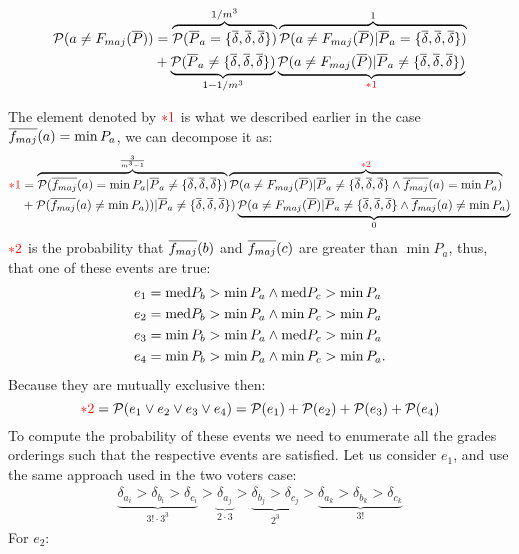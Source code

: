 \documentclass[version=3.21, pagesize, twoside=off, bibliography=totoc, DIV=calc, fontsize=12pt, a4paper]{scrartcl}
\begin{document}
\begin{align}
	\mathcal{P}(a\neq F_{maj}(\overline{P})) &=\overbrace{\mathcal{P}(\overline{P}_a=\{\overline{\delta},\overline{\delta},\overline{\delta}\})}^{1/m^3} \overbrace{\mathcal{P}(a\neq F_{maj}(\overline{P})|\overline{P}_a=\{\overline{\delta},\overline{\delta},\overline{\delta}\})}^{1}\\
	&+\underbrace{\mathcal{P}(\overline{P}_a\neq\{\overline{\delta},\overline{\delta},\overline{\delta}\})}_{1-1/m^3} \underbrace{\mathcal{P}(a\neq F_{maj}(\overline{P})|\overline{P}_a\neq\{\overline{\delta},\overline{\delta},\overline{\delta}\})}_{\color{red}*1}
\end{align}
 
The element denoted by ${\color{red}*1}$ is what we described earlier in the case $\overline{f_{maj}}(a)= \min{P_a}$, we can decompose it as:
\begin{align}
	{\color{red}*1} &=\overbrace{\mathcal{P}(\overline{f_{maj}}(a)= \min{P_a}|\overline{P}_a\neq\{\overline{\delta},\overline{\delta},\overline{\delta}\})}^{\frac{3}{m^3-1}} \overbrace{\mathcal{P}(a\neq F_{maj}(\overline{P})|\overline{P}_a\neq\{\overline{\delta},\overline{\delta},\overline{\delta}\} \wedge \overline{f_{maj}}(a)= \min{P_a})}^{{\color{red}*2}}\\
	&+\mathcal{P}(\overline{f_{maj}}(a)\neq \min{P_a})) |\overline{P}_a\neq\{\overline{\delta},\overline{\delta},\overline{\delta}\}) \underbrace{\mathcal{P}(a\neq F_{maj}(\overline{P})|\overline{P}_a\neq\{\overline{\delta},\overline{\delta},\overline{\delta}\} \wedge \overline{f_{maj}}(a)\neq \min{P_a})}_{0}
\end{align}
${\color{red}*2}$ is the probability that $\overline{f_{maj}}(b)$ and $\overline{f_{maj}}(c)$ are greater than $\min{P_a}$, thus, that one of these events are true:
\begin{align}
	e_1 &= \text{med}{P_{b}}>\min{P_{a}} \wedge \text{med}{P_{c}}>\min{P_{a}}\\
	e_2 &= \text{med}{P_{b}}>\min{P_{a}} \wedge \min{P_{c}}>\min{P_{a}}\\
	e_3 &= \min{P_{b}}>\min{P_{a}} \wedge \text{med}{P_{c}}>\min{P_{a}}\\
	e_4 &= \min{P_{b}}>\min{P_{a}} \wedge \min{P_{c}}>\min{P_{a}}.
\end{align}	
Because they are mutually exclusive then:
	\[{\color{red}*2} =\mathcal{P}(e_1 \vee e_2 \vee e_3 \vee e_4)=\mathcal{P}(e_1)+\mathcal{P}(e_2)+\mathcal{P}(e_3)+\mathcal{P}(e_4)\]
 To compute the probability of these events we need to enumerate all the grades orderings such that the respective events are satisfied. Let us consider $e_1$, and use the same approach used in the two voters case:
 \begin{align}
 	\underbrace{\delta_{a_i}>\delta_{b_i}>\delta_{c_i}}_{3!\cdot 3^3}>\underbrace{\delta_{a_j}}_{2 \cdot 3}>\underbrace{\delta_{b_j}>\delta_{c_j}}_{2^3}>\underbrace{\delta_{a_k}>\delta_{b_k}>\delta_{c_k}}_{3!}
 \end{align}
 For $e_2$:
\end{document}
